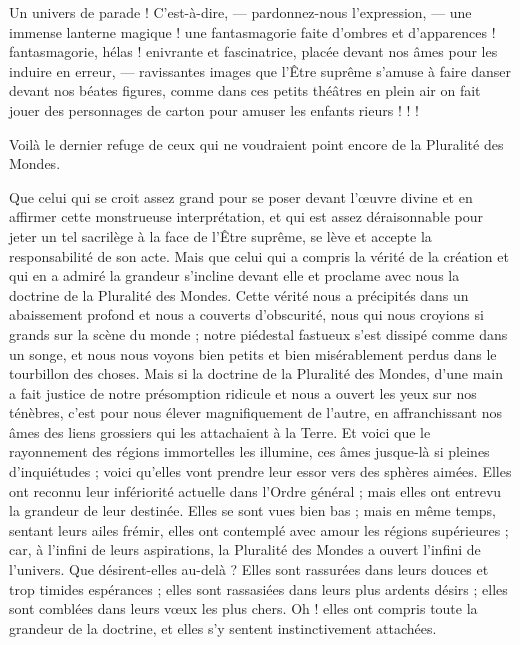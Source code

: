 \documentclass[a4paper, 11pt, oneside]{article}
\begin{document}
Un univers de parade ! C'est-à-dire, --- pardonnez-nous l'expression, --- une immense lanterne magique ! une fantasmagorie faite d'ombres et d'apparences ! fantasmagorie, hélas ! enivrante et fascinatrice, placée devant nos âmes pour les induire en erreur, --- ravissantes images que l'Être suprême s'amuse à faire danser devant nos béates figures, comme dans ces petits théâtres en plein air on fait jouer des personnages de carton pour amuser les enfants rieurs ! ! !

Voilà le dernier refuge de ceux qui ne voudraient point encore de la Pluralité des Mondes.

Que celui qui se croit assez grand pour se poser devant l'œuvre divine et en affirmer cette monstrueuse interprétation, et qui est assez déraisonnable pour jeter un tel sacrilège à la face de l'Être suprême, se lève et accepte la responsabilité de son acte. Mais que celui qui a compris la vérité de la création et qui en a admiré la grandeur s'incline devant elle et proclame avec nous la doctrine de la Pluralité des Mondes. Cette vérité nous a précipités dans un abaissement profond et nous a couverts d'obscurité, nous qui nous croyions si grands sur la scène du monde ; notre piédestal fastueux s'est dissipé comme dans un songe, et nous nous voyons bien petits et bien misérablement perdus dans le tourbillon des choses. Mais si la doctrine de la Pluralité des Mondes, d'une main a fait justice de notre présomption ridicule et nous a ouvert les yeux sur nos ténèbres, c'est pour nous élever magnifiquement de l'autre, en affranchissant nos âmes des liens grossiers qui les attachaient à la Terre. Et voici que le rayonnement des régions immortelles les illumine, ces âmes jusque-là si pleines d'inquiétudes ; voici qu'elles vont prendre leur essor vers des sphères aimées. Elles ont reconnu leur infériorité actuelle dans l'Ordre général ; mais elles ont entrevu la grandeur de leur destinée. Elles se sont vues bien bas ; mais en même temps, sentant leurs ailes frémir, elles ont contemplé avec amour les régions supérieures ; car, à l'infini de leurs aspirations, la Pluralité des Mondes a ouvert l'infini de l'univers. Que désirent-elles au-delà ? Elles sont rassurées dans leurs douces et trop timides espérances ; elles sont rassasiées dans leurs plus ardents désirs ; elles sont comblées dans leurs vœux les plus chers. Oh ! elles ont compris toute la grandeur de la doctrine, et elles s'y sentent instinctivement attachées.
\end{document}
